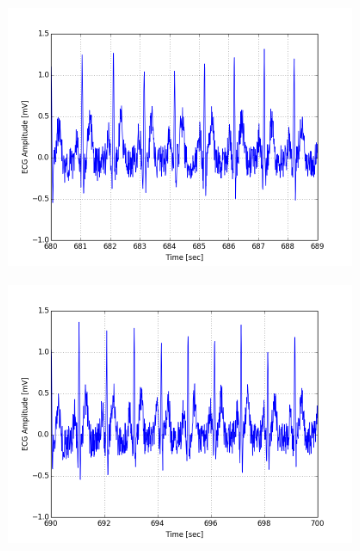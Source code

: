 \documentclass[paper=a4, fontsize=11pt]{scrartcl}
\numberwithin{equation}{section}		%
\numberwithin{figure}{section}			%
\numberwithin{table}{section}		    %
\begin{document}
\begin{appendices}
\begin{figure}[H]
	\centering
	\begin{subfigure}[b]{0.3\textwidth}
		\includegraphics[width=\textwidth]{sim/ecg_22}
	\end{subfigure}
	\begin{subfigure}[b]{0.3\textwidth}
		\includegraphics[width=\textwidth]{sim/ecg_23}
	\end{subfigure}
	\begin{subfigure}[b]{0.3\textwidth}

\end{subfigure}
\end{figure}
\end{appendices}
\end{document}
